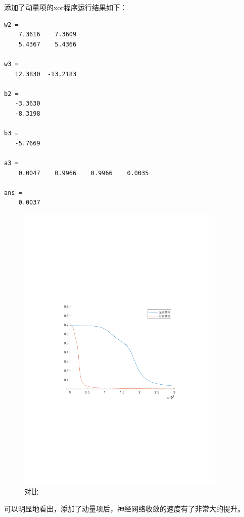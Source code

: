 添加了动量项的xor程序运行结果如下：
\begin{lstlisting}
w2 =
    7.3616    7.3609
    5.4367    5.4366

w3 =
   12.3830  -13.2183

b2 =
   -3.3630
   -8.3198

b3 =
   -5.7669

a3 =
    0.0047    0.9966    0.9966    0.0035
    
ans =
    0.0037
\end{lstlisting}

\begin{figure}[H]
\centering
\includegraphics[width=10cm]{fig/compare.pdf}
\caption{对比}
\end{figure}

可以明显地看出，添加了动量项后，神经网络收敛的速度有了非常大的提升。